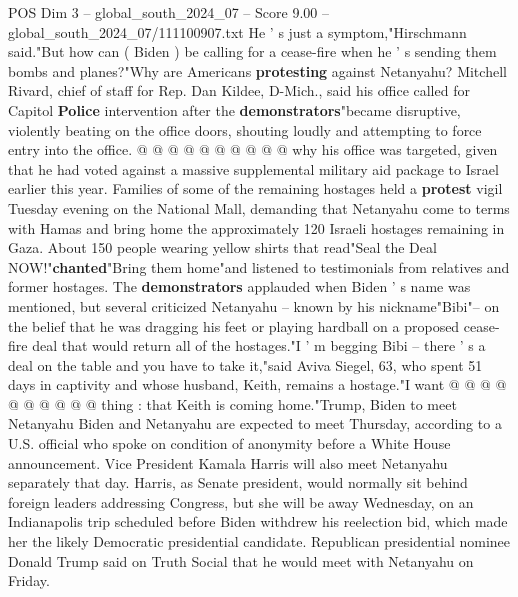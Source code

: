 \begin{textsample}{POS Dim 3 – global\_south\_2024\_07 – Score 9.00 – global\_south\_2024\_07/111100907.txt}
He ' s just a symptom,"Hirschmann said."But how can ( Biden ) be calling for a cease-fire when he ' s sending them bombs and planes?"Why are Americans \textbf{protesting} against Netanyahu?
Mitchell Rivard, chief of staff for Rep.
Dan Kildee, D-Mich., said his office called for Capitol \textbf{Police} intervention after the \textbf{demonstrators}"became disruptive, violently beating on the office doors, shouting loudly and attempting to force entry into the office. @ @ @ @ @ @ @ @ @ @ why his office was targeted, given that he had voted against a massive supplemental military aid package to Israel earlier this year.
Families of some of the remaining hostages held a \textbf{protest} vigil Tuesday evening on the National Mall, demanding that Netanyahu come to terms with Hamas and bring home the approximately 120 Israeli hostages remaining in Gaza.
About 150 people wearing yellow shirts that read"Seal the Deal NOW!"\textbf{chanted}"Bring them home"and listened to testimonials from relatives and former hostages.
The \textbf{demonstrators} applauded when Biden ' s name was mentioned, but several criticized Netanyahu -- known by his nickname"Bibi"-- on the belief that he was dragging his feet or playing hardball on a proposed cease-fire deal that would return all of the hostages."I ' m begging Bibi -- there ' s a deal on the table and you have to take it,"said Aviva Siegel, 63, who spent 51 days in captivity and whose husband, Keith, remains a hostage."I want @ @ @ @ @ @ @ @ @ @ thing : that Keith is coming home."Trump, Biden to meet Netanyahu Biden and Netanyahu are expected to meet Thursday, according to a U.S. official who spoke on condition of anonymity before a White House announcement.
Vice President Kamala Harris will also meet Netanyahu separately that day.
Harris, as Senate president, would normally sit behind foreign leaders addressing Congress, but she will be away Wednesday, on an Indianapolis trip scheduled before Biden withdrew his reelection bid, which made her the likely Democratic presidential candidate.
Republican presidential nominee Donald Trump said on Truth Social that he would meet with Netanyahu on Friday.

\end{textsample}
